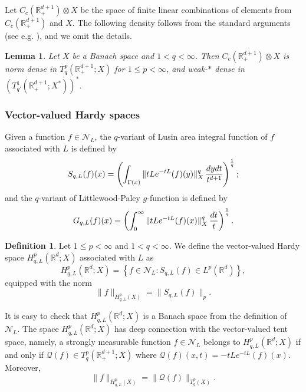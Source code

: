 \documentclass[oneside,english,a4wide]{amsart}
\numberwithin{equation}{section}
\numberwithin{figure}{section}
\theoremstyle{plain}
\theoremstyle{plain}
\theoremstyle{definition}
\theoremstyle{plain}
\newtheorem{lemma}[thm]{Lemma}
\theoremstyle{remark}
\theoremstyle{definition}
\newtheorem{definition}[thm]{Definition}
\theoremstyle{remark}
\theoremstyle{definition}
\newcommand{\real}{{\mathbb R}}
\newcommand{\com}{{\mathbb C}}
\newcommand{\N}{{\mathcal N}}
\newcommand{\Q}{{\mathcal Q}}
\newcommand{\e}{\varepsilon}
\newcommand{\ot}{\otimes}
\newcommand{\8}{+\infty}
\renewcommand{\1}{\mathbbm{1}}
\newcommand\sk[1]{ \left( #1 \right) }
\newcommand\lk[1]{ \left\{ #1 \right\} }
\newcommand{\lara}[1]{\left\langle #1 \right\rangle}
\renewcommand\d{{\rm d}}
\begin{document}
{Let $C_c(\real^{d+1}_+)\otimes X$ be the space of finite linear combinations of elements from $C_c(\real^{d+1}_+)$ and $X$. The following density follows from the standard arguments (see e.g. \cite{Harboure1991}), and we omit the details. %

\begin{lemma}\label{loc}
Let $X$ be a Banach space and $1<q<\infty$. Then
    $C_c(\real^{d+1}_+)\otimes X$ is norm dense in $T^p_q(\real^{d+1}_+; X)$ for $1 \leq p <\infty$, {and weak-$\ast$ dense in $\sk{ T^1_{q'}(\real^{d+1}_+; X^*) }^*$}.
\end{lemma}



\subsubsection{Vector-valued Hardy spaces}
Given a function $ f \in \N_L $, the $q$-variant of Lusin area integral function of $f$ associated with $L$ is defined by
\[
  S_{q,L}(f)(x) = \sk{ \int_{\Gamma(x)} \|tLe^{-tL}(f)(y)\|_X^q\,\frac{\d y \d t}{t^{d+1}} }^{\frac{1}{q}};
\]
and the $q$-variant of Littlewood-Paley $g$-function is defined by
\[
    G_{q,L}(f)(x) =  \sk{ \int_{0}^{\infty} \|tLe^{-tL}(f)(x)\|_X^q\,\frac{\d t}{t} }^{\frac{1}{q}}.
\]

\begin{definition}
Let $ 1 \leq p < \infty$ and $1<q<\infty$. We define the vector-valued Hardy space $H_{q,L}^p(\real^d; X)$ associated with $L$ as 
\[
    H_{q,L}^p(\real^d; X) = \lk{ f \in \N_L: S_{q,L}(f) \in L^p(\real^d)  },
\]
equipped with the norm
\[
    \| f \|_{H^p_{q, L}(X)} = \| S_{q,L}(f) \|_p.
\]
\end{definition}
It is easy to check that $H^p_{q, L}(\real^d; X)$ is a Banach space from the definition of $\N_L$. The space $H^p_{q, L}(\real^d; X)$ has deep connection with the vector-valued tent space, namely, a strongly measurable function $f \in \N_L$ belongs to $H^p_{q, L}(\real^d; X)$ if and only if {$\mathcal Q(f) \in T^p_q(\real^{d+1}_+;X)$ where $\Q(f)(x,t)=-tLe^{-tL}(f)(x)$}. Moreover,
\[
    \| f \|_{H^p_{q, L}(X)} = \| \Q(f) \|_{T^p_q(X)}.
\]

}
\end{document}
